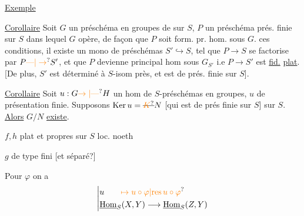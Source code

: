 \uline{Exemple}

\uline{Corollaire} Soit $G$ un préschéma en groupes de   sur $S$,  $P$ un  préschéma  prés. finie sur $S$ dans lequel $G$ opère, de façon que $P$ soit form. pr. hom. sous $G$.  ces conditions, il existe un mono de préschémas $S'\hookrightarrow S$, tel que $P\longrightarrow S$ se factorise par $P\unsure{\text{---}|\to}S'$, et que  $P$ devienne  principal hom sous $G_{S'}$ i.e $P\to S'$ est  \uline{fid.} \uline{plat}. [De  plus, $S'$ est  déterminé à $S$-isom près, et est de prés. finie sur $S$].

\uline{Corollaire} Soit $u:G\unsure{\to|\text{---}}H$ un hom de $S$-préschémas en groupes,  $u$ de présentation finie. Supposons $\mathrm{Ker}\,u=\deleted{\unsure{K}}N$ [qui est de prés finie sur $S$]  sur $S$. \uline{Alors}  $G/N$ \uline{existe}.



$f,h$ plat et propres sur $S$ loc. noeth

$g$  de type fini [et séparé?]


Pour $\varphi$ on a
\[
\left|\begin{aligned}
&u \qquad \unsure{\mapsto u\circ\varphi|\text{res}\,u\circ\varphi}\\
&\underline{\mathrm{Hom}}_S(X,Y)\longrightarrow\underline{\mathrm{Hom}}_S(Z,Y)
\end{aligned}\right.
\]

